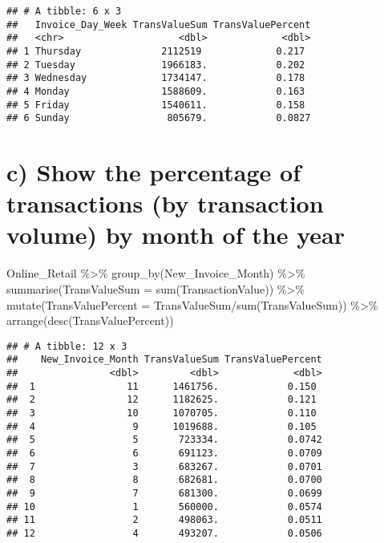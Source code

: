 \documentclass[
]{article}
\newenvironment{Shaded}{\begin{snugshade}}{\end{snugshade}}
\newcommand{\AttributeTok}[1]{\textcolor[rgb]{0.77,0.63,0.00}{#1}}
\newcommand{\FunctionTok}[1]{\textcolor[rgb]{0.00,0.00,0.00}{#1}}
\newcommand{\NormalTok}[1]{#1}
\newcommand{\SpecialCharTok}[1]{\textcolor[rgb]{0.00,0.00,0.00}{#1}}
\begin{document}
\begin{verbatim}
## # A tibble: 6 x 3
##   Invoice_Day_Week TransValueSum TransValuePercent
##   <chr>                    <dbl>             <dbl>
## 1 Thursday              2112519             0.217 
## 2 Tuesday               1966183.            0.202 
## 3 Wednesday             1734147.            0.178 
## 4 Monday                1588609.            0.163 
## 5 Friday                1540611.            0.158 
## 6 Sunday                 805679.            0.0827
\end{verbatim}

\hypertarget{c-show-the-percentage-of-transactions-by-transaction-volume-by-month-of-the-year}{%
\section{c) Show the percentage of transactions (by transaction volume)
by month of the
year}\label{c-show-the-percentage-of-transactions-by-transaction-volume-by-month-of-the-year}}

\begin{Shaded}
\begin{Highlighting}[]
\NormalTok{Online\_Retail }\SpecialCharTok{\%\textgreater{}\%}
  \FunctionTok{group\_by}\NormalTok{(New\_Invoice\_Month) }\SpecialCharTok{\%\textgreater{}\%} 
  \FunctionTok{summarise}\NormalTok{(}\AttributeTok{TransValueSum =} \FunctionTok{sum}\NormalTok{(TransactionValue)) }\SpecialCharTok{\%\textgreater{}\%} 
  \FunctionTok{mutate}\NormalTok{(}\AttributeTok{TransValuePercent =}\NormalTok{ TransValueSum}\SpecialCharTok{/}\FunctionTok{sum}\NormalTok{(TransValueSum)) }\SpecialCharTok{\%\textgreater{}\%} 
  \FunctionTok{arrange}\NormalTok{(}\FunctionTok{desc}\NormalTok{(TransValuePercent))}
\end{Highlighting}
\end{Shaded}

\begin{verbatim}
## # A tibble: 12 x 3
##    New_Invoice_Month TransValueSum TransValuePercent
##                <dbl>         <dbl>             <dbl>
##  1                11      1461756.            0.150 
##  2                12      1182625.            0.121 
##  3                10      1070705.            0.110 
##  4                 9      1019688.            0.105 
##  5                 5       723334.            0.0742
##  6                 6       691123.            0.0709
##  7                 3       683267.            0.0701
##  8                 8       682681.            0.0700
##  9                 7       681300.            0.0699
## 10                 1       560000.            0.0574
## 11                 2       498063.            0.0511
## 12                 4       493207.            0.0506
\end{verbatim}
\end{document}
